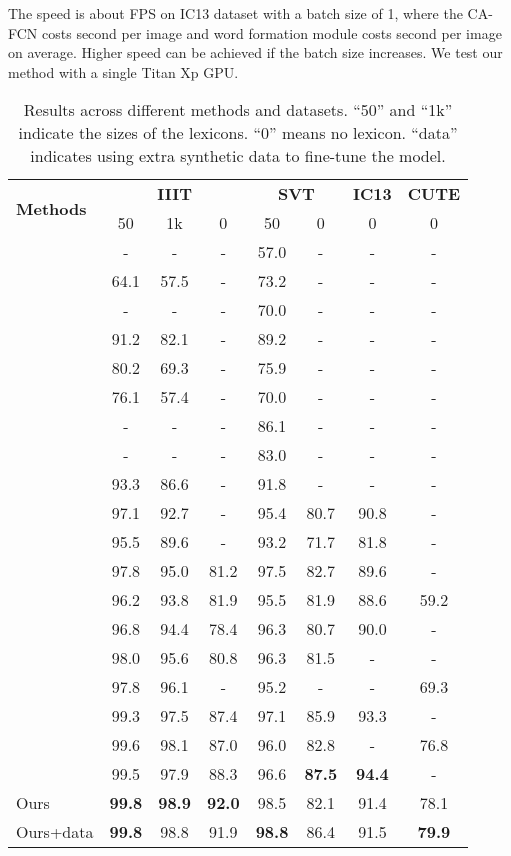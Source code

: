 \documentclass[letterpaper]{article} \usepackage{aaai19}  \usepackage{times}  \usepackage{helvet}  \usepackage{courier}  \usepackage{url}  \usepackage{graphicx}  \frenchspacing  \usepackage{multirow}
\begin{document}
The speed is about  FPS on IC13 dataset with a batch size of 1, where the CA-FCN costs  second per image and word formation module costs  second per image on average. Higher speed can be achieved if the batch size increases. We test our method with a single Titan Xp GPU.


\begin{table*}[!ht]
\caption{Results across different methods and datasets. ``50'' and ``1k'' indicate the sizes of the lexicons. ``0'' means no lexicon. ``data'' indicates using extra synthetic data to fine-tune the model.}
\label{tab:performance}
\centering
\begin{tabular}{|l|ccc|cc|c|c|}
\hline 
\multirow{2}{*}{\textbf{Methods}}  & \multicolumn{3}{c|}{\textbf{IIIT}} & \multicolumn{2}{c|}{\textbf{SVT}}  & \textbf{IC13}  & \textbf{CUTE}\tabularnewline
\cline{2-8} 
& 50 & 1k & 0 & 50 & 0  & 0 & 0\tabularnewline
\hline 
\cite{DBLP:conf/iccv/WangBB11}  & - & - & - & 57.0 & -  & - & -\tabularnewline
\cite{DBLP:conf/bmvc/MishraAJ12}  & 64.1 & 57.5 & - & 73.2 & -  & - & -\tabularnewline
\cite{WangWCN12}  & - & - & - & 70.0 & -  & - & -\tabularnewline
\cite{AlmazanGFV14}  & 91.2 & 82.1 & - & 89.2 & - & - & -\tabularnewline
\cite{YaoBSL14}  & 80.2 & 69.3 & - & 75.9 & -  & - & -\tabularnewline
\cite{Rodriguez-Serrano15}  & 76.1 & 57.4 & - & 70.0 & - & - & -\tabularnewline
\cite{DBLP:conf/eccv/JaderbergVZ14}  & - & - & - & 86.1 & -  & - & -\tabularnewline
\cite{SuL14}  & - & - & - & 83.0 & - & - & -\tabularnewline
\cite{Gordo14}  & 93.3 & 86.6 & - & 91.8 & - & -  & -\tabularnewline
\cite{jaderberg2016reading}  & 97.1 & 92.7 & - & 95.4 & 80.7  & 90.8 & -\tabularnewline
\cite{JaderbergSVZ14b}  & 95.5 & 89.6 & - & 93.2 & 71.7  & 81.8 & -\tabularnewline
\cite{DBLP:journals/pami/ShiBY17} & 97.8 & 95.0 & 81.2 & 97.5 & 82.7  & 89.6 & -\tabularnewline
\cite{DBLP:conf/cvpr/ShiWLYB16}  & 96.2 & 93.8 & 81.9 & 95.5 & 81.9  & 88.6 & 59.2\tabularnewline
\cite{LeeO16}  & 96.8 & 94.4 & 78.4 & 96.3 & 80.7  & 90.0 & -\tabularnewline
\cite{DBLP:conf/nips/WangH17}  & 98.0 & 95.6 & 80.8 & 96.3 & 81.5  & - & -\tabularnewline
\cite{YangHZKG17} & 97.8 & 96.1 & - & 95.2 & - & - & 69.3\tabularnewline
\cite{ChengBXZPZ17}  & 99.3 & 97.5 & 87.4 & 97.1 & 85.9  & 93.3 & -\tabularnewline
\cite{cheng2018aon}  & 99.6 & 98.1 & 87.0 & 96.0 & 82.8  & - & 76.8\tabularnewline
\cite{bai2018edit}  & 99.5 & 97.9 & 88.3 & 96.6 & \textbf{87.5}  & \textbf{94.4} & -\tabularnewline
\hline 
Ours & \textbf{99.8} & \textbf{98.9} & \textbf{92.0} & 98.5 & 82.1  & 91.4 & 78.1 \tabularnewline
Ours+data  & \textbf{99.8}  & 98.8  & 91.9  & \textbf{98.8}  & 86.4  & 91.5 & \textbf{79.9} \tabularnewline
\hline 
\end{tabular}
\end{table*}
\end{document}
